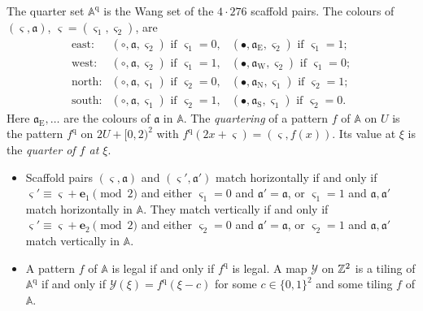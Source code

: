 \begin{definition}[Quarters]\label{fam:def-quarter}
The quarter set $\mathbb A^{\mathrm q}$ is the Wang set of the $4\cdot276$ scaffold pairs. The colours of $(\varsigma,\mathfrak a)$, $\varsigma=(\varsigma_1,\varsigma_2)$, are
\[
\begin{array}{lll}
\text{east:} & (\circ,\mathfrak a,\varsigma_2)\text{ if }\varsigma_1=0, & (\bullet,\mathfrak a_{\mathrm E},\varsigma_2)\text{ if }\varsigma_1=1;\\
\text{west:} & (\circ,\mathfrak a,\varsigma_2)\text{ if }\varsigma_1=1, & (\bullet,\mathfrak a_{\mathrm W},\varsigma_2)\text{ if }\varsigma_1=0;\\
\text{north:} & (\circ,\mathfrak a,\varsigma_1)\text{ if }\varsigma_2=0, & (\bullet,\mathfrak a_{\mathrm N},\varsigma_1)\text{ if }\varsigma_2=1;\\
\text{south:} & (\circ,\mathfrak a,\varsigma_1)\text{ if }\varsigma_2=1, & (\bullet,\mathfrak a_{\mathrm S},\varsigma_1)\text{ if }\varsigma_2=0.
\end{array}
\]
Here $\mathfrak a_{\mathrm E},\dots$ are the colours of $\mathfrak a$ in $\mathbb A$. The \emph{quartering} of a pattern $f$ of $\mathbb A$ on $U$ is the pattern $f^{\mathrm q}$ on $2U+[0,2)^2$ with $f^{\mathrm q}(2x+\varsigma)=(\varsigma,f(x))$. Its value at $\xi$ is the \emph{quarter of $f$ at $\xi$}.
\end{definition}

\begin{lemma}\label{fam:quarter}
\begin{itemize}
\item[(a)] Scaffold pairs $(\varsigma,\mathfrak a)$ and $(\varsigma',\mathfrak a')$ match horizontally if and only if $\varsigma'\equiv\varsigma+\mathbf e_1\pmod 2$ and either $\varsigma_1=0$ and $\mathfrak a'=\mathfrak a$, or $\varsigma_1=1$ and $\mathfrak a,\mathfrak a'$ match horizontally in $\mathbb A$. They match vertically if and only if $\varsigma'\equiv\varsigma+\mathbf e_2\pmod2$ and either $\varsigma_2=0$ and $\mathfrak a'=\mathfrak a$, or $\varsigma_2=1$ and $\mathfrak a,\mathfrak a'$ match vertically in $\mathbb A$.
\item[(b)] A pattern $f$ of $\mathbb A$ is legal if and only if $f^{\mathrm q}$ is legal. A map $\mathcal Y$ on $\mathbb{Z}^2$ is a tiling of $\mathbb A^{\mathrm q}$ if and only if $\mathcal Y(\xi)=f^{\mathrm q}(\xi-c)$ for some $c\in\{0,1\}^2$ and some tiling $f$ of $\mathbb A$.
\end{itemize}
\end{lemma}

